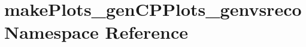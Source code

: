 \hypertarget{namespacemakePlots__genCPPlots__genvsreco}{
\section{makePlots\_\-genCPPlots\_\-genvsreco Namespace Reference}
\label{namespacemakePlots__genCPPlots__genvsreco}
}
